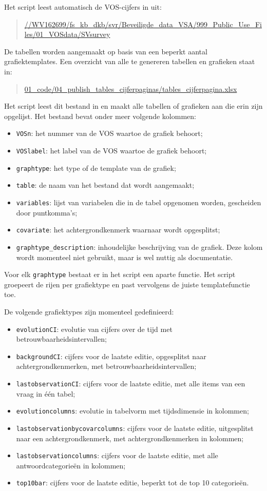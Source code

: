 \documentclass{VSAnote}
\begin{document}
Het script leest automatisch de VOS-cijfers in uit:
\begin{quote}
\url{//WV162699/fs_kb_dkb/svr/Beveiligde_data_VSA/999_Public_Use_Files/01_VOSdata/SVsurvey}
\end{quote}

De tabellen worden aangemaakt op basis van een beperkt aantal grafiektemplates. Een overzicht van alle te genereren tabellen en grafieken staat in:
\begin{quote}
\url{01_code/04_publish_tables_cijferpaginas/tables_cijferpagina.xlsx}
\end{quote}

Het script leest dit bestand in en maakt alle tabellen of grafieken aan die erin zijn opgelijst. Het bestand bevat onder meer volgende kolommen:

\begin{itemize}
\item \verb+VOSn+: het nummer van de VOS waartoe de grafiek behoort;
\item \verb+VOSlabel+: het label van de VOS waartoe de grafiek behoort;
\item \verb+graphtype+: het type of de template van de grafiek;
\item \verb+table+: de naam van het bestand dat wordt aangemaakt;
\item \verb+variables+: lijst van variabelen die in de tabel opgenomen worden, gescheiden door puntkomma's;
\item \verb+covariate+: het achtergrondkenmerk waarnaar wordt opgesplitst;
\item \verb+graphtype_description+: inhoudelijke beschrijving van de grafiek. Deze kolom wordt momenteel niet gebruikt, maar is wel nuttig als documentatie.
\end{itemize}

Voor elk \verb+graphtype+ bestaat er in het script een aparte functie. Het script groepeert de rijen per grafiektype en past vervolgens de juiste templatefunctie toe.

De volgende grafiektypes zijn momenteel gedefinieerd:

\begin{itemize}
\item \verb+evolutionCI+: evolutie van cijfers over de tijd met betrouwbaarheidsintervallen;
\item \verb+backgroundCI+: cijfers voor de laatste editie, opgesplitst naar achtergrondkenmerken, met betrouwbaarheidsintervallen;
\item \verb+lastobservationCI+: cijfers voor de laatste editie, met alle items van een vraag in één tabel;
\item \verb+evolutioncolumns+: evolutie in tabelvorm met tijdsdimensie in kolommen;
\item \verb+lastobservationbycovarcolumns+: cijfers voor de laatste editie, uitgesplitst naar een achtergrondkenmerk, met achtergrondkenmerken in kolommen;
\item \verb+lastobservationcolumns+: cijfers voor de laatste editie, met alle antwoordcategorieën in kolommen;
\item \verb+top10bar+: cijfers voor de laatste editie, beperkt tot de top 10 categorieën.
\end{itemize}
\end{document}
